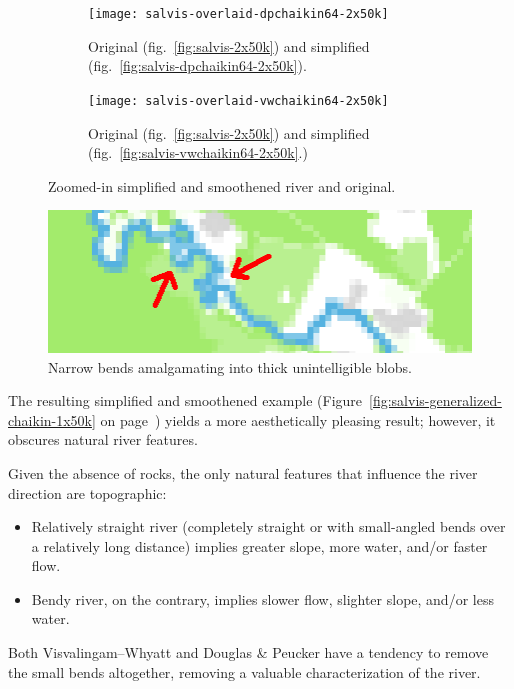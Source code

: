 \documentclass[a4paper]{article}
\newcommand{\onpage}[1]{\ref{#1} on page~\pageref{#1}}
\newcommand{\DP}{Douglas \& Peucker}
\newcommand{\VW}{Visvalingam--Whyatt}
\begin{document}
\begin{figure}[ht!]
    \centering
    \begin{subfigure}[b]{.49\textwidth}
        \texttt{[image: salvis-overlaid-dpchaikin64-2x50k]}

        \caption{Original (fig.~\ref{fig:salvis-2x50k}) and simplified
        (fig.~\ref{fig:salvis-dpchaikin64-2x50k}).}

    \end{subfigure}
    \hfill
    \begin{subfigure}[b]{.49\textwidth}
        \texttt{[image: salvis-overlaid-vwchaikin64-2x50k]}

        \caption{Original (fig.~\ref{fig:salvis-2x50k}) and simplified
            (fig.~\ref{fig:salvis-vwchaikin64-2x50k}.)}

    \end{subfigure}
    \caption{Zoomed-in simplified and smoothened river and original.}
    \label{fig:salvis-overlaid-generalized-chaikin-1x50k}
\end{figure}

\begin{figure}[b]
    \centering
    \includegraphics[width=\textwidth]{amalgamate1}
    \caption{Narrow bends amalgamating into thick unintelligible blobs.}
    \label{fig:pixel-amalgamation}
\end{figure}

The resulting simplified and smoothened example
(Figure~\onpage{fig:salvis-generalized-chaikin-1x50k}) yields a more
aesthetically pleasing result; however, it obscures natural river features.

Given the absence of rocks, the only natural features that influence the river
direction are topographic:

\begin{itemize}
    \item Relatively straight river (completely straight or with small-angled
        bends over a relatively long distance) implies greater slope, more
        water, and/or faster flow.

    \item Bendy river, on the contrary, implies slower flow, slighter slope,
        and/or less water.

\end{itemize}
Both {\VW} and {\DP} have a tendency to remove the small bends altogether,
removing a valuable characterization of the river.
\end{document}
